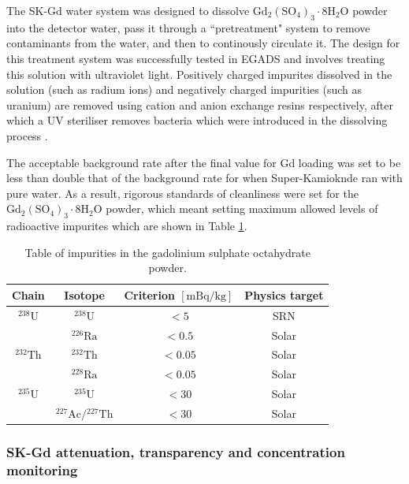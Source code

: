 The SK-Gd water system was designed to dissolve $\mathrm{Gd}_{2}\left(\mathrm{SO}_{4}\right)_{3} \cdot 8 \mathrm{H}_{2} \mathrm{O}$ powder into the detector water, pass it through a ``pretreatment" system to remove contaminants from the water, and then to continously circulate it. The design for this treatment system was successfully tested in EGADS and involves treating this solution with ultraviolet light. Positively charged impurites dissolved in the solution (such as radium ions) and negatively charged impurities (such as uranium) are removed using cation and anion exchange resins respectively, after which a UV steriliser removes bacteria which were introduced in the dissolving process \cite{10.1093/ptep/ptac170}. 

The acceptable background rate after the final value for Gd loading  was set to be less than double that of the background rate for when Super-Kamioknde ran with pure water. As a result, rigorous standards of cleanliness were set for the $\mathrm{Gd}_{2}\left(\mathrm{SO}_{4}\right)_{3} \cdot 8 \mathrm{H}_{2} \mathrm{O}$ powder, which meant setting maximum allowed levels of radioactive impurites which are shown in Table \ref{table:gdpowderradiation}.

\begin{table}
\centering
\begin{tabular}{||cccc||}
    \hline Chain & Isotope & Criterion $[\mathrm{mBq} / \mathrm{kg}]$ & Physics target \\
    \hline${ }^{238} \mathrm{U}$ & ${ }^{238} \mathrm{U}$ & $<5$ & SRN \\
    & ${ }^{226} \mathrm{Ra}$ & $<0.5$ & Solar \\
    \hline${ }^{232} \mathrm{Th}$ & ${ }^{232} \mathrm{Th}$ & $<0.05$ & Solar \\
    & ${ }^{228} \mathrm{Ra}$ & $<0.05$ & Solar \\
    \hline${ }^{235} \mathrm{U}$ & ${ }^{235} \mathrm{U}$ & $<30$ & Solar \\
    & ${ }^{227} \mathrm{Ac} /{ }^{227} \mathrm{Th}$ & $<30$ & Solar \\
    \hline 
    \end{tabular}
\caption{Table of impurities in the gadolinium sulphate octahydrate powder.}
\label{table:gdpowderradiation}
\end{table}

\subsubsection{SK-Gd attenuation, transparency and concentration monitoring}


